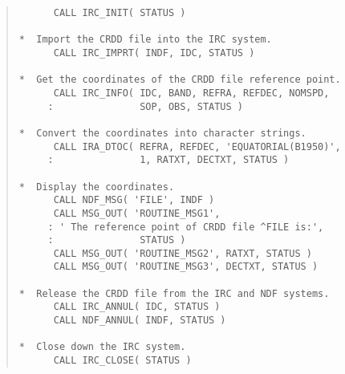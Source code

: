 \begin{quote}
\begin{tabbing}
\verb#      CALL IRC_INIT( STATUS )                          #\\
\verb#                                                       #\\
\verb#*  Import the CRDD file into the IRC system.           #\\
\verb#      CALL IRC_IMPRT( INDF, IDC, STATUS )              #\\
\verb#                                                       #\\
\verb#*  Get the coordinates of the CRDD file reference point.#\\
\verb#      CALL IRC_INFO( IDC, BAND, REFRA, REFDEC, NOMSPD, #\\
\verb#     :               SOP, OBS, STATUS )                #\\
\verb#                                                       #\\
\verb#*  Convert the coordinates into character strings.     #\\
\verb#      CALL IRA_DTOC( REFRA, REFDEC, 'EQUATORIAL(B1950)',#\\
\verb#     :               1, RATXT, DECTXT, STATUS )        #\\
\verb#                                                       #\\
\verb#*  Display the coordinates.                            #\\
\verb#      CALL NDF_MSG( 'FILE', INDF )                     #\\
\verb#      CALL MSG_OUT( 'ROUTINE_MSG1',                    #\\
\verb#     : ' The reference point of CRDD file ^FILE is:',  #\\
\verb#     :               STATUS )                          #\\
\verb#      CALL MSG_OUT( 'ROUTINE_MSG2', RATXT, STATUS )    #\\
\verb#      CALL MSG_OUT( 'ROUTINE_MSG3', DECTXT, STATUS )   #\\
\verb#                                                       #\\
\verb#*  Release the CRDD file from the IRC and NDF systems. #\\
\verb#      CALL IRC_ANNUL( IDC, STATUS )                    #\\
\verb#      CALL NDF_ANNUL( INDF, STATUS )                   #\\
\verb#                                                       #\\
\verb#*  Close down the IRC system.                          #\\
\verb#      CALL IRC_CLOSE( STATUS )                         #\\

\end{tabbing}
\end{quote}


